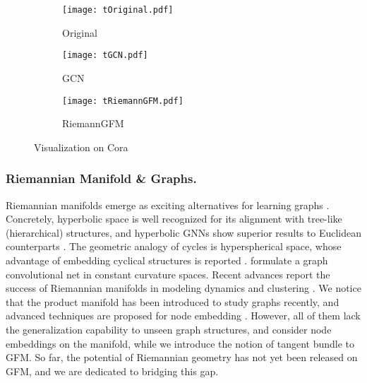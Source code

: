 \begin{figure}[t]
    \centering
    \begin{subfigure}{0.31\linewidth}
        \centering
        \texttt{[image: tOriginal.pdf]}
        \caption{Original}
        \label{fig:Original}
    \end{subfigure}
    \begin{subfigure}{0.31\linewidth}
        \centering
        \texttt{[image: tGCN.pdf]}
        \caption{GCN}
        \label{fig:GCN}
    \end{subfigure}
    \begin{subfigure}{0.31\linewidth}
        \centering
        \texttt{[image: tRiemannGFM.pdf]}
        \caption{RiemannGFM}
        \label{fig:RiemannGFM}
    \end{subfigure}
        \vspace{-0.1in}  
    \caption{Visualization on Cora}
    \label{fig:tSNE}
    \vspace{-0.15in}
\end{figure}

  \vspace{-0.05in}
\subsubsection*{\textbf{Riemannian Manifold \& Graphs.}}
Riemannian manifolds emerge as exciting alternatives for learning graphs \cite{nips24sun,aaai24sun,icdm23sun}.
Concretely, hyperbolic space is well recognized for its alignment with tree-like (hierarchical) structures,
and hyperbolic GNNs show superior results to Euclidean counterparts \cite{nips18hnn,nips19hgcn}. 
The geometric analogy of cycles is hyperspherical space, whose advantage of embedding cyclical structures is reported \cite{22cikmSpherical,nips19sphericalText}. 
\citet{icml20Constant} formulate a graph convolutional net in constant curvature spaces.
Recent advances report the success of Riemannian manifolds in modeling dynamics  \cite{aaai21sun,cikm22sun,aaai23sun,aaai25sun,www23ye} and clustering \cite{icml24sun,www24sun,ijcai23sun}.
We notice that the product manifold has been introduced to study graphs recently, 
and advanced techniques are proposed for node embedding \cite{iclr19mixCurvature,iclr23lantentGraphProduct,aaai22selfMG,cikm24wang}.
However, all of them lack the generalization capability to unseen graph structures, and consider node embeddings on the manifold, while we introduce the notion of tangent bundle to GFM.
So far, the potential of Riemannian geometry has not yet been released on GFM, and we are dedicated to bridging this gap.

  \vspace{-0.1in}
